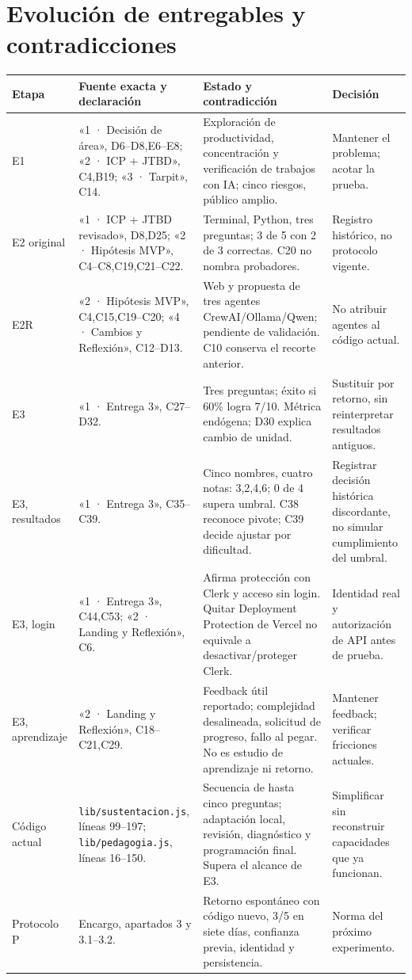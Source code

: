 \documentclass[11pt,a4paper]{report}
\newcommand{\src}[2]{\nolinkurl{#1}, líneas #2}
\begin{document}
\chapter{Evolución de entregables y contradicciones}
\label{ch:evolucion}
\begin{longtable}{P{2.2cm}P{5.5cm}P{5cm}P{3.1cm}}
\toprule Etapa & Fuente exacta y declaración & Estado y contradicción & Decisión \\\midrule\endhead
E1 & «1 · Decisión de área», D6--D8,E6--E8; «2 · ICP + JTBD», C4,B19; «3 · Tarpit», C14. & Exploración de productividad, concentración y verificación de trabajos con IA; cinco riesgos, público amplio. & Mantener el problema; acotar la prueba.\\
E2 original & «1 · ICP + JTBD revisado», D8,D25; «2 · Hipótesis MVP», C4--C8,C19,C21--C22. & Terminal, Python, tres preguntas; 3 de 5 con 2 de 3 correctas. C20 no nombra probadores. & Registro histórico, no protocolo vigente.\\
E2R & «2 · Hipótesis MVP», C4,C15,C19--C20; «4 · Cambios y Reflexión», C12--D13. & Web y propuesta de tres agentes CrewAI/Ollama/Qwen; pendiente de validación. C10 conserva el recorte anterior. & No atribuir agentes al código actual.\\
E3 & «1 · Entrega 3», C27--D32. & Tres preguntas; éxito si 60\% logra 7/10. Métrica endógena; D30 explica cambio de unidad. & Sustituir por retorno, sin reinterpretar resultados antiguos.\\
E3, resultados & «1 · Entrega 3», C35--C39. & Cinco nombres, cuatro notas: 3,2,4,6; 0 de 4 supera umbral. C38 reconoce pivote; C39 decide ajustar por dificultad. & Registrar decisión histórica discordante, no simular cumplimiento del umbral.\\
E3, login & «1 · Entrega 3», C44,C53; «2 · Landing y Reflexión», C6. & Afirma protección con Clerk y acceso sin login. Quitar Deployment Protection de Vercel no equivale a desactivar/proteger Clerk. & Identidad real y autorización de API antes de prueba.\\
E3, aprendizaje & «2 · Landing y Reflexión», C18--C21,C29. & Feedback útil reportado; complejidad desalineada, solicitud de progreso, fallo al pegar. No es estudio de aprendizaje ni retorno. & Mantener feedback; verificar fricciones actuales.\\
Código actual & \src{lib/sustentacion.js}{99--197}; \src{lib/pedagogia.js}{16--150}. & Secuencia de hasta cinco preguntas; adaptación local, revisión, diagnóstico y programación final. Supera el alcance de E3. & Simplificar sin reconstruir capacidades que ya funcionan.\\
Protocolo P & Encargo, apartados 3 y 3.1--3.2. & Retorno espontáneo con código nuevo, 3/5 en siete días, confianza previa, identidad y persistencia. & Norma del próximo experimento.\\\bottomrule
\end{longtable}
\end{document}
